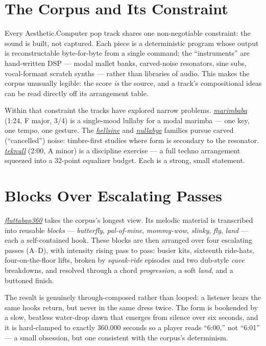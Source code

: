\documentclass[11pt,letterpaper]{article}
\newcommand{\ac}{Aesthetic\textcolor{acpink}{.}Computer}
\newcommand{\trk}[2]{\href{https://assets.aesthetic.computer/pop/#1.mp3}{\textit{#2}}}
\newcommand{\fl}{\trk{fluttabap360}{fluttabap360}}
\begin{document}
\section{The Corpus and Its Constraint}

Every \ac{} pop track shares one non-negotiable constraint: the sound is built, not captured. Each piece is a deterministic program whose output is reconstructable byte-for-byte from a single command; the ``instruments'' are hand-written DSP --- modal mallet banks, carved-noise resonators, sine subs, vocal-formant scratch synths --- rather than libraries of audio. This makes the corpus unusually legible: the score \textit{is} the source, and a track's compositional ideas can be read directly off its arrangement table.

Within that constraint the tracks have explored narrow problems. \trk{marimbaba}{marimbaba} (1:24, F major, 3/4) is a single-mood lullaby for a modal marimba --- one key, one tempo, one gesture. The \trk{hellsine}{hellsine} and \trk{nullabye}{nullabye} families pursue carved (``cancelled'') noise: timbre-first studies where form is secondary to the resonator. \trk{teknull}{teknull} (2:00, A minor) is a discipline exercise --- a full techno arrangement squeezed into a 32-point equalizer budget. Each is a strong, small statement.

\section{Blocks Over Escalating Passes}

\fl{} takes the corpus's longest view. Its melodic material is transcribed into reusable \textit{blocks} --- \textit{butterfly}, \textit{pal-of-mine}, \textit{mommy-wow}, \textit{slinky}, \textit{fly}, \textit{land} --- each a self-contained hook. These blocks are then arranged over four escalating passes (A--D), with intensity rising pass to pass: busier kits, sixteenth ride-hats, four-on-the-floor lifts, broken by \textit{squeak-ride} episodes and two dub-style \textit{cave} breakdowns, and resolved through a chord \textit{progression}, a soft \textit{land}, and a buttoned finish.

The result is genuinely through-composed rather than looped: a listener hears the same hooks return, but never in the same dress twice. The form is bookended by a slow, beatless water-drop dawn that emerges from silence over six seconds, and it is hard-clamped to exactly 360.000 seconds so a player reads ``6:00,'' not ``6:01'' --- a small obsession, but one consistent with the corpus's determinism.
\end{document}
